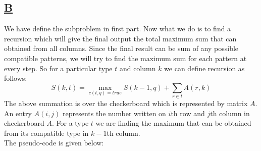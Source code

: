 \documentclass[14pt]{article}
\begin{document}
		\subsection*{\underline{B}}
			\noindent
			\newline
			We have define the subproblem in first part. Now what we do is to find a recursion which will give the final output the total maximum sum that can obtained from all columns. Since the final result can be sum of any possible compatible patterns, we will try to find the maximum sum for each pattern at every step. So for a particular type $t$ and column $k$ we can define recursion as follows:
			\[
				S(k, t) = \max_{c(t, q) = true}S(k-1, q) + \sum_{r \in t}A(r, k)
			\] 
			The above summation is over the checkerboard which is represented by matrix $A$. An entry $A(i, j)$ represents the number written on $i$th row and $j$th column in checkerboard $A$. For a type $t$ we are finding the maximum that can be obtained from its compatible type in $k-1$th column.\\
			The pseudo-code is given below:
			
\end{document}
